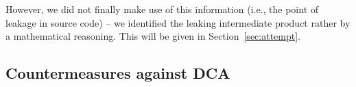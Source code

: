However, we did not finally make use of this information (i.e., the point of leakage in source code) -- we identified the leaking intermediate product rather by a mathematical reasoning. This will be given in Section~\ref{sec:attempt}.




\subsection{Countermeasures against DCA}

